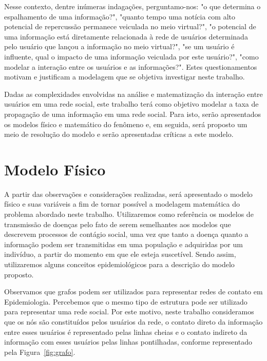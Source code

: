 \documentclass[
	12pt,				%
	openright,			%
	oneside,			%
	a4paper,			%
	english,			%
	french,				%
	spanish,			%
	brazil				%
	]{abntex2}
\begin{document}
Nesse contexto, dentre inúmeras indagações, perguntamo-nos: "o que
determina o espalhamento de uma informação?", "quanto tempo uma
notícia com alto potencial de repercussão permanece veiculada no meio
virtual?", "o potencial de uma informação está diretamente relacionada
à rede de usuários determinada pelo usuário que lançou a informação no
meio virtual?", "se um usuário é influente, qual o impacto de uma
informação veiculada por este usuário?", "como modelar a interação
entre os usuários e as informações?". Estes questionamentos motivam e
justificam a modelagem que se objetiva investigar neste trabalho.

Dadas as complexidades envolvidas na análise e matematização da
interação entre usuários em uma rede social, este trabalho terá como
objetivo modelar a taxa de propagação de uma informação em uma rede
social. Para isto, serão apresentados os modelos físico e matemático
do fenômeno e, em seguida, será proposto um meio de resolução do
modelo e serão apresentadas críticas a este modelo.


\chapter{Modelo Físico}
A partir das observações e considerações realizadas, será apresentado
o modelo físico e suas variáveis a fim de tornar possível a modelagem
matemática do problema abordado neste trabalho. Utilizaremos como
referência os modelos de transmissão de doenças pelo fato de serem
semelhantes aos modelos que descrevem processos de contágio social,
uma vez que tanto a doença quanto a informação podem ser transmitidas
em uma população e adquiridas por um indivíduo, a partir do momento em
que ele esteja suscetível. Sendo assim, utilizaremos alguns conceitos
epidemiológicos para a descrição do modelo proposto.

Observamos que grafos podem ser utilizados para representar redes de
contato em Epidemiologia. Percebemos que o mesmo tipo de estrutura
pode ser utilizado para representar uma rede social. Por este motivo,
neste trabalho consideramos que os nós são constituídos pelos usuários
da rede, o contato direto da informação entre esses usuários é
representado pelas linhas cheias e o contato indireto da informação
com esses usuários pelas linhas pontilhadas, conforme representado
pela Figura~\ref{fig:grafo}.
\end{document}
